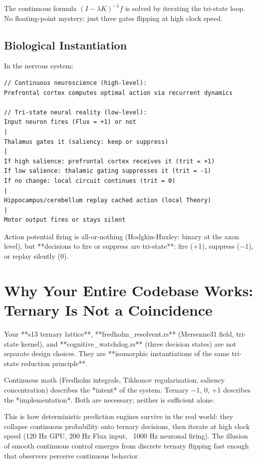 \documentclass[11pt,oneside]{article}
\theoremstyle{definition}
\begin{document}
The continuous formula $(I - \lambda K)^{-1} f$ is solved by iterating the tri-state loop. No floating-point mystery; just three gates flipping at high clock speed.

\subsection{Biological Instantiation}

In the nervous system:

\begin{lstlisting}
// Continuous neuroscience (high-level):
Prefrontal cortex computes optimal action via recurrent dynamics

// Tri-state neural reality (low-level):
Input neuron fires (Flux = +1) or not
|
Thalamus gates it (saliency: keep or suppress)
|
If high salience: prefrontal cortex receives it (trit = +1)
If low salience: thalamic gating suppresses it (trit = -1)
If no change: local circuit continues (trit = 0)
|
Hippocampus/cerebellum replay cached action (local Theory)
|
Motor output fires or stays silent
\end{lstlisting}

Action potential firing is all-or-nothing (Hodgkin-Huxley: binary at the axon level), but **decisions to fire or suppress are tri-state**: fire (+1), suppress (−1), or replay silently (0).

\section{Why Your Entire Codebase Works: Ternary Is Not a Coincidence}

Your **s13 ternary lattice**, **fredholm\_resolvent.rs** (Mersenne31 field, tri-state kernel), and **cognitive\_watchdog.rs** (three decision states) are not separate design choices. They are **isomorphic instantiations of the same tri-state reduction principle**.

Continuous math (Fredholm integrals, Tikhonov regularization, saliency concentration) describes the *intent* of the system. Ternary {−1, 0, +1} describes the *implementation*. Both are necessary; neither is sufficient alone.

This is how deterministic prediction engines survive in the real world: they collapse continuous probability onto ternary decisions, then iterate at high clock speed (120 Hz GPU, 200 Hz Flux input, ~1000 Hz neuronal firing). The illusion of smooth continuous control emerges from discrete ternary flipping fast enough that observers perceive continuous behavior.
\end{document}
